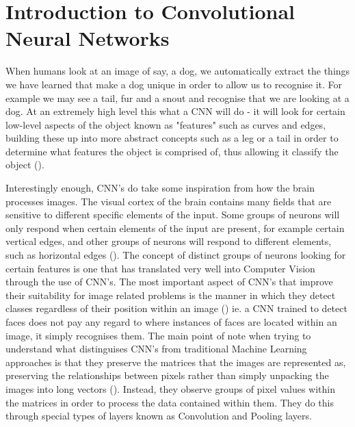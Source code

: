 \documentclass[12pt]{report}
\begin{document}
\section{Introduction to Convolutional Neural Networks}
\begin{flushleft}
When humans look at an image of say, a dog, we automatically extract the things we have learned that make a dog unique in order to allow us to recognise it. For example we may see a tail, fur and a snout and recognise that we are looking at a dog. At an extremely high level this what a CNN will do - it will look for certain low-level aspects of the object known as "features" such as curves and edges, building these up into more abstract concepts such as a leg or a tail in order to determine what features the object is comprised of, thus allowing it classify the object (\cite{lecun1995convolutional}).
\end{flushleft}

\begin{flushleft}
Interestingly enough, CNN's do take some inspiration from how the brain processes images. The visual cortex of the brain contains many fields that are sensitive to different specific elements of the input. Some groups of neurons will only respond when certain elements of the input are present, for example certain vertical edges, and other groups of neurons will respond to different elements, such as horizontal edges (\cite{youtube}). The concept of distinct groups of neurons looking for certain features is one that has translated very well into Computer Vision through the use of CNN's. The most important aspect of CNN's that improve their suitability for image related problems is the manner in which they detect classes regardless of their position within an image (\cite{albawi2017understanding}) ie. a CNN trained to detect faces does not pay any regard to where instances of faces are located within an image, it simply recognises them. The main point of note when trying to understand what distinguises CNN's from traditional Machine Learning approaches is that they preserve the matrices that the images are represented as, preserving the relationships between pixels rather than simply unpacking the images into long vectors (\cite{lecun1995convolutional}). Instead, they observe groups of pixel values within the matrices in order to process the data contained within them. They do this through special types of layers known as Convolution and Pooling layers.
\end{flushleft}
\end{document}

